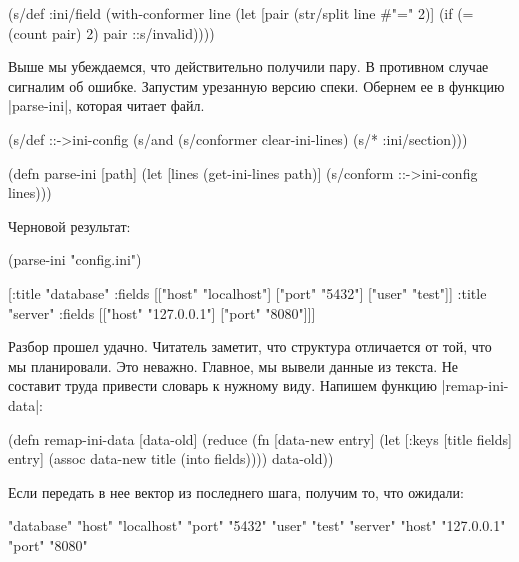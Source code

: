 \begin{english}
  \begin{clojure}
(s/def :ini/field
  (with-conformer line
    (let [pair (str/split line #"=" 2)]
      (if (= (count pair) 2)
        pair
        ::s/invalid))))
  \end{clojure}
\end{english}

Выше мы убеждаемся, что действительно получили пару. В противном случае сигналим
об ошибке. Запустим урезанную версию спеки. Обернем ее в функцию
\spverb|parse-ini|, которая читает файл.

\begin{english}
  \begin{clojure}
(s/def ::->ini-config
  (s/and
   (s/conformer clear-ini-lines)
   (s/* :ini/section)))

(defn parse-ini [path]
  (let [lines (get-ini-lines path)]
    (s/conform ::->ini-config lines)))
  \end{clojure}
\end{english}

\noindent
Черновой результат:

\begin{english}
  \begin{clojure}
(parse-ini "config.ini")

[{:title "database"
  :fields [["host" "localhost"]
           ["port" "5432"]
           ["user" "test"]]}
 {:title "server"
  :fields [["host" "127.0.0.1"]
           ["port" "8080"]]}]
  \end{clojure}
\end{english}

Разбор прошел удачно. Читатель заметит, что структура отличается от той, что мы
планировали. Это неважно. Главное, мы вывели данные из текста. Не составит труда
привести словарь к нужному виду. Напишем функцию \spverb|remap-ini-data|:

\begin{english}
  \begin{clojure}
(defn remap-ini-data [data-old]
  (reduce
   (fn [data-new entry]
     (let [{:keys [title fields]} entry]
       (assoc data-new title (into {} fields))))
   {}
   data-old))
  \end{clojure}
\end{english}

\noindent
Если передать в нее вектор из последнего шага, получим то, что ожидали:

\begin{english}
  \begin{clojure}
{"database" {"host" "localhost" "port" "5432" "user" "test"}
 "server" {"host" "127.0.0.1" "port" "8080"}}
  \end{clojure}
\end{english}

